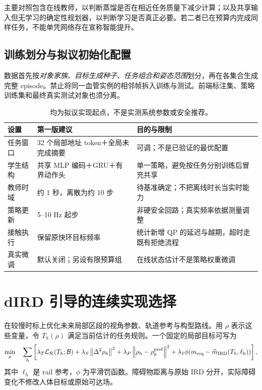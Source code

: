\documentclass[UTF8,11pt,a4paper,fontset=fandol]{ctexart}
\numberwithin{equation}{section}
\theoremstyle{definition}
\newcommand{\norm}[1]{\left\lVert#1\right\rVert}
\begin{document}
主要对照包含在线教师，以判断蒸馏是否在相近任务质量下减少计算；以及共享输入但无学习的确定性规划器，以判断学习是否真正必要。若二者已在预算内完成同样任务，不能单凭网络存在宣称智能提升。

\subsection{训练划分与拟议初始化配置}
数据首先按\emph{对象家族、目标生成种子、任务组合和姿态范围}划分，再在各集合生成完整 episode。禁止将同一血管实例的相邻帧拆入训练与测试。前端标注集、策略训练集和最终真实测试对象也须分离。

\begin{table}[htbp]\centering\small
\begin{tabularx}{\linewidth}{P{34mm}YY}
\toprule
设置 & 第一版建议 & 目的与限制\\\midrule
任务窗口 & 32 个局部地址 token＋全局未完成摘要 & 可调；不是已验证的最优配置\\
学生结构 & 共享 MLP 编码＋GRU＋有界动作头 & 单一策略，避免按任务分别训练后冒充共享\\
教师时域 & 约 1 秒，离散为约 10 步 & 待基准确定；不把离线时长当实时能力\\
策略更新 & 5--10 Hz 起步 & 非硬安全回路；真实频率依据测量调整\\
接触执行 & 保留原快环目标频率 & 统计新增 QP 的延迟与越期，超时走既有拒绝流程\\
真实微调 & 默认关闭；另设有限预算组 & 在线状态估计不是策略权重微调\\\bottomrule
\end{tabularx}
\caption{均为拟议实现起点，不是实测系统参数或安全推荐。}
\end{table}

\section{dIRD 引导的连续实现选择}
\label{sec:dird}
在较慢时标上优化未来局部区段的视角参数、轨道参考与构型路线。用 $\rho$ 表示这些变量，令 $T_h(\rho)$ 满足当前估计的任务规则。一个固定的局部目标可写为
\begin{equation}
\min_\rho\quad
\sum_h \left[
\lambda_T\mathcal L_{\mathcal R}(T_h;\mathcal B)
+\lambda_S\norm{\Delta^2\rho_h}^2
+\lambda_P\norm{\rho_h-\rho_h^{\rm pref}}^2
+\lambda_I\phi(m_{\rm req}-\widehat m_{\rm IRD}(T_h,\ell_h))
\right],
\label{eq:dirdcost}
\end{equation}
其中 $\ell_h$ 是 rail 参考，$\phi$ 为平滑罚函数。障碍物距离与原始 IRD 分开，实际障碍变化不修改人体目标或原始可达场。
\end{document}
